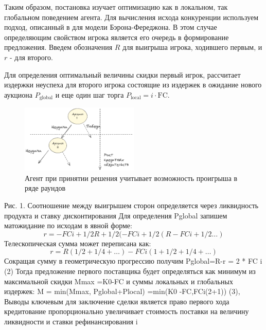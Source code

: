 Таким образом, постановка изучает оптимизацию как в локальном, так  глобальном поведением агента. Для вычисления исхода конкуренции используем подход, описанный в \cite{Bogdanov2023} для модели Бэрона-Фереджона. В этом случае определяющим свойством игрока является его очередь в формирование предложения. Введем обозначения $R$ для  выигрыша игрока, ходившего первым, и  $r$ - для второго.

Для определения оптимальный величины скидки первый игрок, рассчитает издержки неуспеха для  второго игрока состоящие из издержек в ожидание нового аукциона $P_\text{global}$ и еще один шаг торга $P_\text{local}= i \cdot \text{FC}$.

\begin{figure}[h]
    \centering
    \includegraphics[width=0.5\textwidth]{assets/settings/dynamic.excalidraw.png}
    \caption{Агент при принятии решения учитывает возможность проигрыша в ряде раундов}
\end{figure}

Рис. 1. Соотношение между выигрышем сторон определяется через ликвидность продукта и ставку дисконтирования
Для определения Pglobal запишем матожидание по исходам в явной форме:
$$
    r  = - FC i   + 1/ 2 R  + 1/2  (- FC i   + 1/2  (R - FC i + 1/2 \dots)
$$
Телескопическая сумма может переписана как:
$$
    r = R (1/2 + 1/4 + \dots)  - FC i  (1 +1/2 +1/4 + \dots)
$$
Сокращая сумму в геометрическую прогрессию получим 
Pglobal=R-r = 2 * FC i  (2)
Тогда предложение первого поставщика будет определяться как минимум из максимальной скидки Mmax =K0-FC и суммы локальных и глобальных издержек:
M = min(Mmax,   Pglobal+Plocal) =min(K0 -FC,FCi(2+1)) (3),
Выводы 
ключевым для заключение сделки является право первого хода
кредитование пропорционально увеличивает стоимость поставки на величину ликвидности  и ставки рефинансирования i
